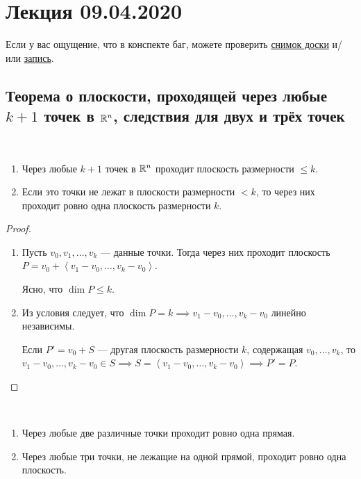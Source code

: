 \section{Лекция 09.04.2020} 

Если у вас ощущение, что в конспекте баг, можете проверить \href{https://www.dropbox.com/s/fty6fb2vuyugzdk/LA_19-20_osn_Lecture26.svg?dl=0}{снимок доски} и/или \href{https://youtu.be/U-UZGNDM1SA}{запись}.

\subsection{Теорема о плоскости, проходящей через любые $k+1$ точек в $\mathbb{R}^n$, следствия для двух и трёх точек}

\begin{theorem}~
    \begin{enumerate}[label=\alph*)]
    \item Через любые $k + 1$ точек в $\mathbb{R}^n$ проходит плоскость размерности $\leq k$.
    \item Если это точки не лежат в плоскости размерности $<k$, то через них проходит ровно одна плоскость размерности $k$.
    \end{enumerate}
\end{theorem}

\begin{proof}~
    \begin{enumerate}[label=\alph*)]
        \item Пусть $v_0, v_1, \dots, v_k$ --- данные точки. Тогда через них проходит плоскость $P = v_0 + \left< v_1 - v_0, \dots, v_k - v_0 \right>$.

            Ясно, что $\dim P \leq k$.

        \item Из условия следует, что $\dim P = k \implies v_1 - v_0, \dots, v_k - v_0$ линейно независимы.

            Если $P' = v_0 + S$ --- другая плоскость размерности $k$, содержащая $v_0, \dots, v_k$, то $v_1 - v_0, \dots, v_k - v_0 \in S \implies S = \left< v_1 - v_0, \dots, v_k - v_0 \right> \implies P' = P$.
            \qedhere
    \end{enumerate}
\end{proof}

\begin{corollary}~
    \begin{enumerate}
    \item Через любые две различные точки проходит ровно одна прямая.
    \item Через любые три точки, не лежащие на одной прямой, проходит ровно одна плоскость.
    \end{enumerate}
\end{corollary}


